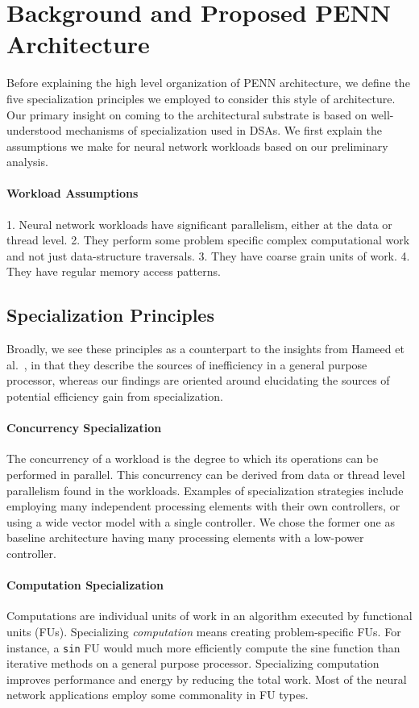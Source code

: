 \section{Background and Proposed PENN Architecture}\label{sec:arch}

Before explaining the high level organization of PENN
architecture, we define the five specialization principles 
we employed to consider this style of architecture.
Our primary insight on coming to the architectural substrate
is based on well-understood mechanisms of specialization used in DSAs.
We first explain the assumptions we make for neural network workloads based on
our preliminary analysis.

\paragraph{Workload Assumptions}
1. Neural network workloads have significant parallelism, 
either at the data or thread level. 2. They perform some problem specific complex 
computational work and not just data-structure traversals. 3. They have coarse grain units of work. 
4. They have regular memory access patterns.

\subsection{Specialization Principles}

Broadly, we see these principles as a counterpart to the insights from Hameed et
al.~\cite{gpp_innef}, in that they describe the sources of inefficiency in a
general purpose processor, whereas our findings are oriented around
elucidating the sources of potential efficiency gain from specialization.  

\paragraph{Concurrency Specialization}
The concurrency of a workload is the degree to which its operations can be performed
in parallel. This concurrency can be derived from data or thread level parallelism
found in the workloads. 
Examples of specialization strategies
include employing many independent processing elements with their own controllers,
or using a wide vector model with a single controller.
We chose the former one as baseline architecture having many processing elements
with a low-power controller.

\paragraph{Computation Specialization}  
Computations are individual units of work in an algorithm executed by
functional units (FUs).
Specializing \emph{computation} means creating problem-specific FUs.  
For instance, a \texttt{sin} FU would much more efficiently compute the sine function than
iterative methods on a general purpose processor.
Specializing computation improves performance and energy by
reducing the total work.
Most of the neural network applications employ some commonality
in FU types.

